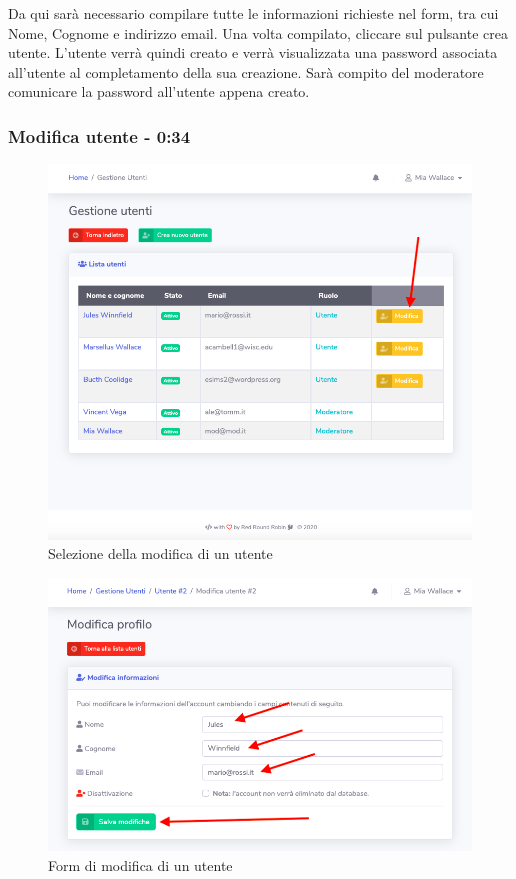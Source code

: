 		Da qui sarà necessario compilare tutte le informazioni richieste nel form, tra cui Nome, Cognome e indirizzo email.
		Una volta compilato, cliccare sul pulsante crea utente.
		L'utente verrà quindi creato e verrà visualizzata una password associata all'utente al completamento della sua creazione. Sarà compito del moderatore comunicare la password all'utente appena creato.

	\subsubsection{Modifica utente - 0:34}
		\begin{figure}[H]
		\centering
		\includegraphics[scale=0.600]{res/images/mod/selModUtente.png}
		\caption{Selezione della modifica di un utente}
	\end{figure}
	\begin{figure}[H]
		\centering
		\includegraphics[scale=0.600]{res/images/mod/modUtente.png}
		\caption{Form di modifica di un utente}
	\end{figure}
